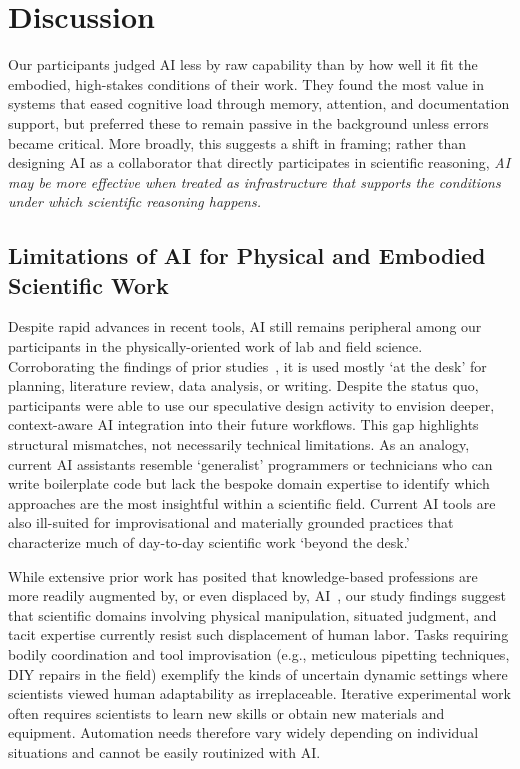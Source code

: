 \section{Discussion}

Our participants judged AI less by raw capability than by how well it fit the embodied, high-stakes conditions of their work. They found the most value in systems that eased cognitive load through memory, attention, and documentation support, but preferred these to remain passive in the background unless errors became critical. More broadly, this suggests a shift in framing; rather than designing AI as a collaborator that directly participates in scientific reasoning, \emph{AI may be more effective when treated as infrastructure that supports the conditions under which scientific reasoning happens.}


\subsection{Limitations of AI for Physical and Embodied Scientific Work}

Despite rapid advances in recent tools, AI still remains peripheral among our participants in the physically-oriented work of lab and field science. Corroborating the findings of prior studies~\cite{wagman2025generative, morris2023scientists}, it is used mostly `at the desk' for planning, literature review, data analysis, or writing. Despite the status quo, participants were able to use our speculative design activity to envision deeper, context-aware AI integration into their future workflows. This gap highlights structural mismatches, not necessarily technical limitations. As an analogy, current AI assistants resemble `generalist' programmers or technicians who can write boilerplate code but lack the bespoke domain expertise to identify which approaches are the most insightful within a scientific field. Current AI tools are also ill-suited for improvisational and materially grounded practices that characterize much of day-to-day scientific work `beyond the desk.'

While extensive prior work has posited that knowledge-based professions are more readily augmented by, or even displaced by, AI~\cite{tomlinson2025working, brynjolfsson2025canaries, maslej2025artificial, sherman2025amazon, de2023generative}, our study findings suggest that scientific domains involving physical manipulation, situated judgment, and tacit expertise currently resist such displacement of human labor. Tasks requiring bodily coordination and tool improvisation (e.g., meticulous pipetting techniques, DIY repairs in the field) exemplify the kinds of uncertain dynamic settings where scientists viewed human adaptability as irreplaceable. Iterative experimental work often requires scientists to learn new skills or obtain new materials and equipment. Automation needs therefore vary widely depending on individual situations and cannot be easily routinized with AI.

